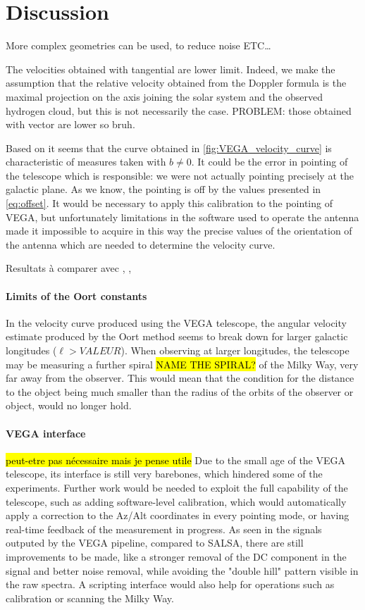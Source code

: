 \section{Discussion}
More complex geometries can be used, to reduce noise ETC\ldots \cite{burke_introduction_2013}

The velocities obtained with tangential are lower limit.
Indeed, we make the assumption that the relative velocity obtained from the Doppler formula is the maximal projection on the axis joining the solar system and the observed hydrogen cloud, but this is not necessarily the case.
PROBLEM: those obtained with vector are lower so bruh.

Based on \cite{sakhawat_hossain_salsa_2018} it seems that the curve obtained in \autoref{fig:VEGA_velocity_curve} is characteristic of measures taken with $b \neq 0$. It could be the error in pointing of the telescope which is responsible: we were not actually pointing precisely at the galactic plane. As we know, the pointing is off by the values presented in \autoref{eq:offset}.
It would be necessary to apply this calibration to the pointing of VEGA, but unfortunately limitations in the software used to operate the antenna made it  impossible to acquire in this way the precise values of the orientation of the antenna which are needed to determine the velocity curve.

Resultats à comparer avec \cite{ou_dark_2024}, \cite{jia_research_2022}, \cite{mroz_rotation_2019}

\paragraph{Limits of the Oort constants}
In the velocity curve produced using the VEGA telescope, the angular velocity estimate produced by the Oort method seems to break down for larger galactic longitudes ($\ell > VALEUR$). When observing at larger longitudes, the telescope may be measuring a further spiral \hl{NAME THE SPIRAL?} of the Milky Way, very far away from the observer. This would mean that the condition for the distance to the object being much smaller than the radius of the orbits of the observer or object, would no longer hold. 

\paragraph{VEGA interface}
\hl{peut-etre pas nécessaire mais je pense utile}
Due to the small age of the VEGA telescope, its interface is still very barebones, which hindered some of the experiments. Further work would be needed to exploit the full capability of the telescope, such as adding software-level calibration, which would automatically apply a correction to the Az/Alt coordinates in every pointing mode, or having real-time feedback of the measurement in progress. As seen in the signals outputed by the VEGA pipeline, compared to SALSA, there are still improvements to be made, like a stronger removal of the DC component in the signal and better noise removal, while avoiding the "double hill" pattern visible in the raw spectra. A scripting interface would also help for operations such as calibration or scanning the Milky Way.